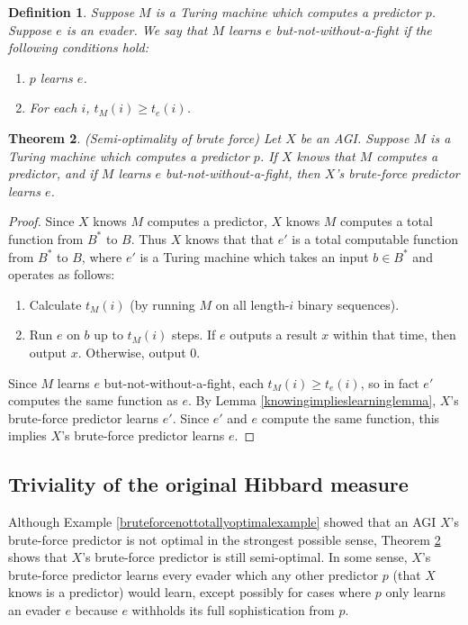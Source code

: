\documentclass{article}
\newtheorem{theorem}{Theorem}
\newtheorem{definition}[theorem]{Definition}
\begin{document}
\begin{definition}
    Suppose $M$ is a Turing machine which computes a predictor $p$.
    Suppose $e$ is an evader.
    We say that \emph{$M$ learns $e$ but-not-without-a-fight}
    if the following conditions hold:
    \begin{enumerate}
        \item $p$ learns $e$.
        \item For each $i$, $t_M(i)\geq t_e(i)$.
    \end{enumerate}
\end{definition}

\begin{theorem}
\label{semioptimalitytheorem}
    (Semi-optimality of brute force)
    Let $X$ be an AGI.
    Suppose $M$ is a Turing machine which computes a predictor $p$.
    If $X$ knows that $M$ computes a predictor, and if $M$ learns $e$
    but-not-without-a-fight, then $X$'s brute-force predictor learns $e$.
\end{theorem}

\begin{proof}
    Since $X$ knows $M$ computes a predictor, $X$ knows $M$ computes a total
    function from $B^*$ to $B$. Thus $X$ knows that that $e'$ is a total
    computable function from $B^*$ to $B$, where $e'$ is a Turing machine which
    takes an input $b\in B^*$ and operates as follows:
    \begin{enumerate}
        \item
        Calculate $t_M(i)$ (by running $M$ on all length-$i$ binary sequences).
        \item
        Run $e$ on $b$ up to $t_M(i)$ steps. If $e$ outputs a result $x$ within that
        time, then output $x$. Otherwise, output $0$.
    \end{enumerate}
    Since $M$ learns $e$ but-not-without-a-fight, each $t_M(i)\geq t_e(i)$,
    so in fact $e'$ computes the same function as $e$.
    By Lemma \ref{knowingimplieslearninglemma}, $X$'s brute-force predictor
    learns $e'$. Since $e'$ and $e$ compute the same function, this implies
    $X$'s brute-force predictor learns $e$.
\end{proof}

\subsection{Triviality of the original Hibbard measure}
\label{trivialitysubsection}

Although Example \ref{bruteforcenottotallyoptimalexample} showed that
an AGI $X$'s brute-force predictor
is not optimal in the strongest possible sense, Theorem \ref{semioptimalitytheorem}
shows that $X$'s brute-force predictor is still semi-optimal. In some sense,
$X$'s brute-force predictor learns every evader which any other predictor $p$ (that $X$
knows is a predictor) would learn, except possibly for cases where $p$ only learns
an evader $e$ because $e$ withholds its full sophistication from $p$.
\end{document}
